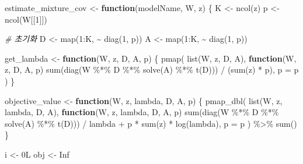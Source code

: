 \documentclass[
]{book}
\newenvironment{Shaded}{\begin{snugshade}}{\end{snugshade}}
\newcommand{\AttributeTok}[1]{\textcolor[rgb]{0.77,0.63,0.00}{#1}}
\newcommand{\CommentTok}[1]{\textcolor[rgb]{0.56,0.35,0.01}{\textit{#1}}}
\newcommand{\ConstantTok}[1]{\textcolor[rgb]{0.00,0.00,0.00}{#1}}
\newcommand{\ControlFlowTok}[1]{\textcolor[rgb]{0.13,0.29,0.53}{\textbf{#1}}}
\newcommand{\DecValTok}[1]{\textcolor[rgb]{0.00,0.00,0.81}{#1}}
\newcommand{\FunctionTok}[1]{\textcolor[rgb]{0.00,0.00,0.00}{#1}}
\newcommand{\NormalTok}[1]{#1}
\newcommand{\OtherTok}[1]{\textcolor[rgb]{0.56,0.35,0.01}{#1}}
\newcommand{\SpecialCharTok}[1]{\textcolor[rgb]{0.00,0.00,0.00}{#1}}
\begin{document}
\begin{Shaded}
\begin{Highlighting}[]
\NormalTok{estimate\_mixture\_cov }\OtherTok{\textless{}{-}} \ControlFlowTok{function}\NormalTok{(modelName, W, z) \{}
\NormalTok{  K }\OtherTok{\textless{}{-}} \FunctionTok{ncol}\NormalTok{(z)}
\NormalTok{  p }\OtherTok{\textless{}{-}} \FunctionTok{ncol}\NormalTok{(W[[}\DecValTok{1}\NormalTok{]])}

  \CommentTok{\# 초기화}
\NormalTok{  D }\OtherTok{\textless{}{-}} \FunctionTok{map}\NormalTok{(}\DecValTok{1}\SpecialCharTok{:}\NormalTok{K, }\SpecialCharTok{\textasciitilde{}} \FunctionTok{diag}\NormalTok{(}\DecValTok{1}\NormalTok{, p))}
\NormalTok{  A }\OtherTok{\textless{}{-}} \FunctionTok{map}\NormalTok{(}\DecValTok{1}\SpecialCharTok{:}\NormalTok{K, }\SpecialCharTok{\textasciitilde{}} \FunctionTok{diag}\NormalTok{(}\DecValTok{1}\NormalTok{, p))}
  
\NormalTok{  get\_lambda }\OtherTok{\textless{}{-}} \ControlFlowTok{function}\NormalTok{(W, z, D, A, p) \{}
    \FunctionTok{pmap}\NormalTok{(}
      \FunctionTok{list}\NormalTok{(W, z, D, A),}
      \ControlFlowTok{function}\NormalTok{(W, z, D, A, p)}
        \FunctionTok{sum}\NormalTok{(}\FunctionTok{diag}\NormalTok{(W }\SpecialCharTok{\%*\%}\NormalTok{ D }\SpecialCharTok{\%*\%} \FunctionTok{solve}\NormalTok{(A) }\SpecialCharTok{\%*\%} \FunctionTok{t}\NormalTok{(D))) }\SpecialCharTok{/}\NormalTok{ (}\FunctionTok{sum}\NormalTok{(z) }\SpecialCharTok{*}\NormalTok{ p),}
      \AttributeTok{p =}\NormalTok{ p}
\NormalTok{      )}
\NormalTok{  \}}
  
\NormalTok{  objective\_value }\OtherTok{\textless{}{-}} \ControlFlowTok{function}\NormalTok{(W, z, lambda, D, A, p) \{}
    \FunctionTok{pmap\_dbl}\NormalTok{(}
      \FunctionTok{list}\NormalTok{(W, z, lambda, D, A),}
      \ControlFlowTok{function}\NormalTok{(W, z, lambda, D, A, p)}
        \FunctionTok{sum}\NormalTok{(}\FunctionTok{diag}\NormalTok{(W }\SpecialCharTok{\%*\%}\NormalTok{ D }\SpecialCharTok{\%*\%} \FunctionTok{solve}\NormalTok{(A) }\SpecialCharTok{\%*\%} \FunctionTok{t}\NormalTok{(D))) }\SpecialCharTok{/}\NormalTok{ lambda }\SpecialCharTok{+}
\NormalTok{        p }\SpecialCharTok{*} \FunctionTok{sum}\NormalTok{(z) }\SpecialCharTok{*} \FunctionTok{log}\NormalTok{(lambda),}
      \AttributeTok{p =}\NormalTok{ p}
\NormalTok{    ) }\SpecialCharTok{\%\textgreater{}\%}
      \FunctionTok{sum}\NormalTok{()}
\NormalTok{  \}}
  
\NormalTok{  i }\OtherTok{\textless{}{-}}\NormalTok{ 0L}
\NormalTok{  obj }\OtherTok{\textless{}{-}} \ConstantTok{Inf}
  

\end{Highlighting}
\end{Shaded}
\end{document}
